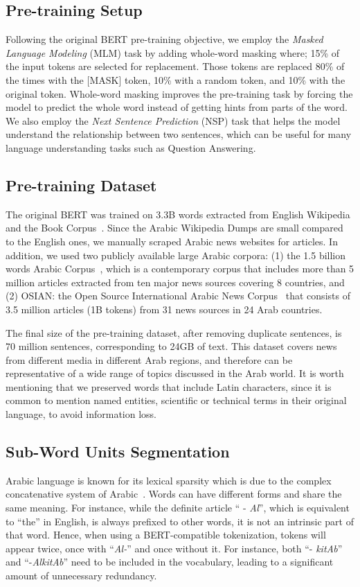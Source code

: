 \documentclass[10pt, a4paper]{article}
\begin{document}
\subsection{Pre-training Setup}
Following the original BERT pre-training objective, we employ the \emph{Masked Language Modeling} (MLM) task by adding whole-word masking where; 15\% of the  input tokens are selected for replacement.  Those tokens are replaced 80\% of the times with the [MASK] token, 10\% with a random token, and 10\% with the original token.  Whole-word masking improves the pre-training task by forcing the model to predict the whole word instead of getting hints from parts of the word.  We also employ the \emph{Next Sentence Prediction} (NSP) task that helps the model understand the relationship between two sentences, which can be useful for many language understanding tasks such as Question Answering.

\subsection{Pre-training Dataset}
The original BERT was trained on 3.3B words extracted from English Wikipedia and the Book Corpus~\cite{zhu2015aligning}.  Since the Arabic Wikipedia Dumps are small compared to the English ones, we manually scraped Arabic news websites for articles.  In addition, we used two publicly available large Arabic corpora:
(1) the 1.5 billion words Arabic Corpus~\cite{el20161}, which is a contemporary corpus that includes more than 5 million articles extracted from ten major news sources covering 8 countries, and (2) OSIAN: the Open Source International Arabic News Corpus~\cite{zeroual-etal-2019-osian} that consists of 3.5 million articles (1B tokens) from 31 news sources in 24 Arab countries.

The final size of the pre-training dataset, after removing duplicate sentences, is 70 million sentences, corresponding to 24GB of text.  This dataset covers news from different media in different Arab regions, and therefore can be representative of a wide range of topics discussed in the Arab world.  It is worth mentioning that we preserved words that include Latin characters, since it is common to mention named entities, scientific or technical terms in their original language, to avoid information loss. 


\subsection{Sub-Word Units Segmentation}
Arabic language is known for its lexical sparsity which is due to the complex concatenative system of Arabic~\cite{al2017aroma}. Words can have different forms and share the same meaning.  For instance, while the definite article `` - \textit{Al}'', which is equivalent to ``the'' in English, is always prefixed to other words, it is not an intrinsic part of that word.  Hence, when using a BERT-compatible tokenization, tokens will appear twice, once with ``\textit{Al-}'' and once without it.  For instance, both ``- \emph{kitAb}'' and ``-\emph{AlkitAb}'' need to be included in the vocabulary, leading to a significant amount of unnecessary redundancy.
\end{document}
